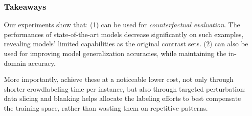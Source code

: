 \subsubsection{Takeaways}
\label{subsec:label_takeaway}


Our experiments show that:
(1) \sysname can be used for \emph{counterfactual evaluation}.
The performances of state-of-the-art models decrease significantly on such examples, revealing models' limited capabilities as the original contrast sets.
(2) \sysname can also be used for improving model generalization accuracies, while maintaining the in-domain accuracy.

More importantly, \sysname achieve these at a noticeable lower cost, not only through shorter crowdlabeling time per instance, but also through targeted perturbation: data slicing and blanking helps allocate the labeling efforts to best compensate the training space, rather than wasting them on repetitive patterns.

